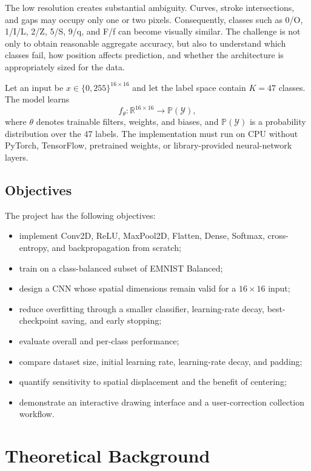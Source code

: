 \documentclass[a4paper,12pt]{extreport}
\begin{document}
The low resolution creates substantial ambiguity. Curves, stroke intersections, and gaps may occupy only one or two pixels. Consequently, classes such as 0/O, 1/I/L, 2/Z, 5/S, 9/q, and F/f can become visually similar. The challenge is not only to obtain reasonable aggregate accuracy, but also to understand which classes fail, how position affects prediction, and whether the architecture is appropriately sized for the data.

Let an input be $x\in\{0,255\}^{16\times16}$ and let the label space contain $K=47$ classes. The model learns
\begin{equation}
f_{\theta}:\mathbb{R}^{16\times16}\rightarrow\mathbb{P}(\mathcal{Y}),
\end{equation}
where $\theta$ denotes trainable filters, weights, and biases, and $\mathbb{P}(\mathcal{Y})$ is a probability distribution over the 47 labels. The implementation must run on CPU without PyTorch, TensorFlow, pretrained weights, or library-provided neural-network layers.

\section{Objectives}
The project has the following objectives:
\begin{itemize}[leftmargin=2em]
    \item implement Conv2D, ReLU, MaxPool2D, Flatten, Dense, Softmax, cross-entropy, and backpropagation from scratch;
    \item train on a class-balanced subset of EMNIST Balanced;
    \item design a CNN whose spatial dimensions remain valid for a $16\times16$ input;
    \item reduce overfitting through a smaller classifier, learning-rate decay, best-checkpoint saving, and early stopping;
    \item evaluate overall and per-class performance;
    \item compare dataset size, initial learning rate, learning-rate decay, and padding;
    \item quantify sensitivity to spatial displacement and the benefit of centering;
    \item demonstrate an interactive drawing interface and a user-correction collection workflow.
\end{itemize}

\chapter{Theoretical Background}
\label{sec:theoretical-background}
\end{document}
